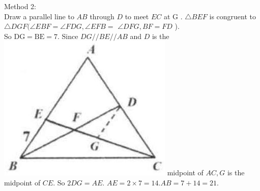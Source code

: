 \documentclass{article}
\begin{document}
Method 2:\\
Draw a parallel line to \(A B\) through \(D\) to meet \(E C\) at G . \(\triangle B E F\) is congruent to \(\triangle D G F(\angle E B F=\angle F D G, \angle E F B=\) \(\angle D F G, B F=F D\) ).\\
So \(\mathrm{DG}=\mathrm{BE}=7\). Since \(D G / / B E / / A B\) and \(D\) is the\\
\includegraphics[width=\textwidth]{images/133.jpg} midpoint of \(A C, G\) is the midpoint of \(C E\). So \(2 D G=A E\). \(A E=2 \times 7=14 . A B=7+14=21\).
\end{document}
